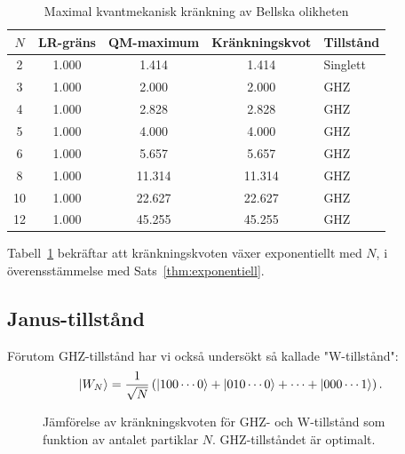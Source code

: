 \documentclass[12pt,a4paper]{article}
\theoremstyle{plain}
\theoremstyle{definition}
\theoremstyle{remark}
\begin{document}
\begin{table}[ht]
\centering
\caption{Maximal kvantmekanisk kr\"ankning av Bellska olikheten}
\label{tab:violation}
\begin{tabular}{ccccl}
\toprule
$N$ & LR-gr\"ans & QM-maximum & Kr\"ankningskvot & Tillst\r{a}nd \\
\midrule
2 & 1.000 & 1.414 & 1.414 & Singlett \\
3 & 1.000 & 2.000 & 2.000 & GHZ \\
4 & 1.000 & 2.828 & 2.828 & GHZ \\
5 & 1.000 & 4.000 & 4.000 & GHZ \\
6 & 1.000 & 5.657 & 5.657 & GHZ \\
8 & 1.000 & 11.314 & 11.314 & GHZ \\
10 & 1.000 & 22.627 & 22.627 & GHZ \\
12 & 1.000 & 45.255 & 45.255 & GHZ \\
\bottomrule
\end{tabular}
\end{table}

Tabell~\ref{tab:violation} bekr\"aftar att kr\"ankningskvoten
v\"axer exponentiellt med $N$, i \"overensst\"ammelse med
Sats~\ref{thm:exponentiell}.

\subsection{Janus-tillst\r{a}nd}

F\"orutom GHZ-tillst\r{a}nd har vi ocks\r{a} unders\"okt
s\r{a} kallade "W-tillst\r{a}nd":
\begin{equation}
\label{eq:w_state}
\ket{W_N} = \frac{1}{\sqrt{N}} \left( \ket{100\cdots0} + \ket{010\cdots0} + \cdots + \ket{000\cdots1} \right).
\end{equation}

\begin{figure}[ht]
\centering
{}
\caption{J\"amf\"orelse av kr\"ankningskvoten f\"or GHZ- och W-tillst\r{a}nd
som funktion av antalet partiklar $N$. GHZ-tillst\r{a}ndet \"ar optimalt.}
\label{fig:violation}
\end{figure}
\end{document}
